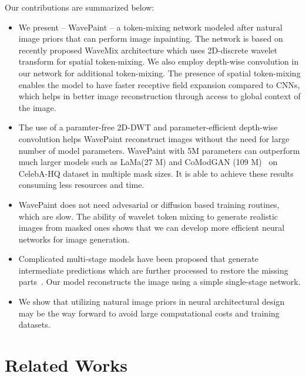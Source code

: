 \documentclass{article}
\begin{document}
Our contributions are summarized below:

\begin{itemize}
    \item We present -- WavePaint -- a token-mixing network modeled after natural image priors that can perform image inpainting. The network is based on recently proposed WaveMix architecture which uses 2D-discrete wavelet transform for spatial token-mixing. We also employ depth-wise convolution in our network for additional token-mixing. The presence of spatial token-mixing enables the model to have faster receptive field expansion compared to CNNs, which helps in better image reconstruction through access to global context of the image.
    
    \item The use of a paramter-free 2D-DWT and parameter-efficient depth-wise convolution helps WavePaint reconstruct images without the need for large number of model parameters. WavePaint with 5M parameters can outperform much larger models such as LaMa(27 M) and CoModGAN (109 M)~\cite{CoMod_GAN2021} on CelebA-HQ dataset in multiple mask sizes. It is able to achieve these results consuming less resources and time.
    
    \item WavePaint does not need advesarial or diffusion based training routines, which are slow. The ability of wavelet token mixing to generate realistic images from masked ones shows that we can develop more efficient neural networks for image generation. 
    
    \item Complicated multi-stage models have been proposed that generate intermediate predictions which are further processed to restore the missing parts~\cite{liu2020rethinking, nazeri2019edgeconnect, song2018spgnet}. Our model reconstructs the image using a simple single-stage network.

    \item We show that utilizing natural image priors in neural architectural design may be the way forward to avoid large computational costs and training datasets.

\end{itemize}






\section{Related Works}
\end{document}
